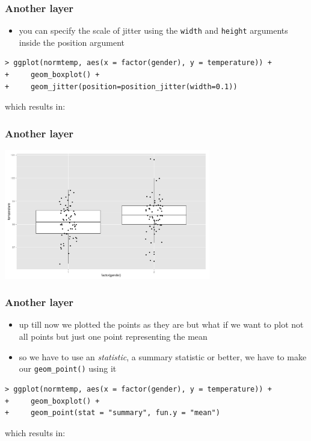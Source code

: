 \documentclass[xcolor={table}]{beamer}
\begin{document}
\begin{frame}[fragile]\frametitle{Another layer}
  \begin{itemize}
  \item you can specify the scale of jitter using the \texttt{width} and \texttt{height} arguments inside the position argument
  \end{itemize}\small
\begin{verbatim}
> ggplot(normtemp, aes(x = factor(gender), y = temperature)) +
+     geom_boxplot() +
+     geom_jitter(position=position_jitter(width=0.1))
\end{verbatim}
which results in:
\end{frame}

\begin{frame}\frametitle{Another layer}
  \begin{center}
    \includegraphics[width=9cm]{boxplotjitter2.png}
  \end{center}
\end{frame}


\begin{frame}[fragile]\frametitle{Another layer}
  \begin{itemize}
  \item up till now we plotted the points as they are but what if we want to plot not all points but just one point representing the mean
  \item so we have to use an \textit{statistic}, a summary statistic or better, we have to make our \texttt{geom\_point()} using it
  \end{itemize}\small
\begin{verbatim}
> ggplot(normtemp, aes(x = factor(gender), y = temperature)) +
+     geom_boxplot() +
+     geom_point(stat = "summary", fun.y = "mean")
\end{verbatim}
which results in:
\end{frame}
\end{document}
